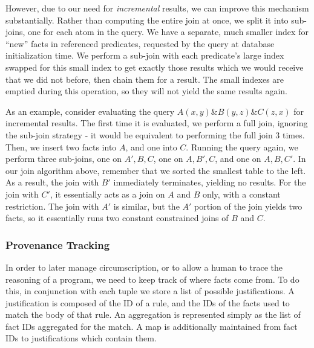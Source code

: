 However, due to our need for \emph{incremental} results, we can improve this mechanism substantially.
Rather than computing the entire join at once, we split it into sub-joins, one for each atom in the query.
We have a separate, much smaller index for ``new'' facts in referenced predicates, requested by the query at database initialization time.
We perform a sub-join with each predicate's large index swapped for this small index to get exactly those results which we would receive that we did not before, then chain them for a result.
The small indexes are emptied during this operation, so they will not yield the same results again.

As an example, consider evaluating the query $A(x, y) \& B(y, z) \& C(z, x)$ for incremental results.
The first time it is evaluated, we perform a full join, ignoring the sub-join strategy - it would be equivalent to performing the full join 3 times.
Then, we insert two facts into $A$, and one into $C$.
Running the query again, we perform three sub-joins, one on $A', B, C$, one on $A, B', C$, and one on $A, B, C'$.
In our join algorithm above, remember that we sorted the smallest table to the left.
As a result, the join with $B'$ immediately terminates, yielding no results.
For the join with $C'$, it essentially acts as a join on $A$ and $B$ only, with a constant restriction.
The join with $A'$ is similar, but the $A'$ portion of the join yields two facts, so it essentially runs two constant constrained joins of $B$ and $C$.

\subsubsection{Provenance Tracking}
In order to later manage circumscription, or to allow a human to trace the reasoning of a program, we need to keep track of where facts come from.
To do this, in conjunction with each tuple we store a list of possible justifications.
A justification is composed of the ID of a rule, and the IDs of the facts used to match the body of that rule.
An aggregation is represented simply as the list of fact IDs aggregated for the match.
A map is additionally maintained from fact IDs to justifications which contain them.

